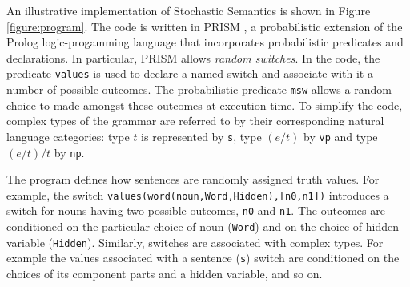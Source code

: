 \documentclass[a4paper,11pt]{article}
\renewcommand{\cite}{\citep}
\theoremstyle{definition}
\begin{document}




An illustrative implementation of Stochastic Semantics is shown in Figure \ref{figure:program}. The code is written in PRISM  \cite{Sato:97}, a probabilistic extension of the Prolog logic-progamming language that incorporates probabilistic predicates and declarations. In particular, PRISM allows {\em random switches}. In the code, the predicate \texttt{values} is used to declare a named switch and associate with it a number of possible outcomes. The probabilistic predicate \texttt{msw} allows a random choice to made amongst these outcomes at execution time. To simplify the code, complex types of the grammar are referred to by their corresponding natural language
categories: type $t$ is represented by \texttt{s}, type $(e/t)$ by \texttt{vp} and type $(e/t)/t$ by \texttt{np}. 

The program defines how sentences are randomly assigned truth values. For example, the switch
\texttt{values(word(noun,Word,Hidden),[n0,n1])} 
introduces a switch for nouns having two possible outcomes, \texttt{n0} and \texttt{n1}.
The outcomes are conditioned on the particular choice of noun (\texttt{Word}) and on the choice of hidden variable (\texttt{Hidden}). Similarly, switches are associated with complex types. For example the values associated with a sentence (\texttt{s}) switch are conditioned on the choices of its component parts and a hidden variable, and so on.
\end{document}
